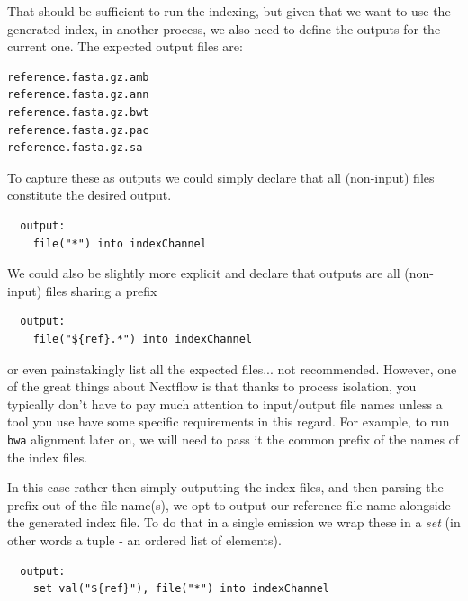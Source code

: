 That should be sufficient to run the indexing, but given that we want to use the generated index,
in another process, we also need to define the outputs for the current one. 
The expected output files are:

\begin{lstlisting}
reference.fasta.gz.amb
reference.fasta.gz.ann
reference.fasta.gz.bwt
reference.fasta.gz.pac
reference.fasta.gz.sa
\end{lstlisting}

To capture these as outputs we could simply declare that all (non-input)
files constitute the desired output.

\begin{lstlisting}
  output:
    file("*") into indexChannel 
\end{lstlisting}

We could also be slightly more explicit and declare that outputs are all (non-input)
files sharing a prefix

\begin{lstlisting}
  output:
    file("${ref}.*") into indexChannel 
\end{lstlisting}

or even painstakingly list all the expected files... not recommended.
%
%
%
However, one of the great things about Nextflow is that thanks to process isolation, 
you typically don't have to pay much attention to input/output file names 
unless a tool you use have some specific requirements in this regard.
For example, to run \texttt{bwa} alignment later on, we will need to pass it 
the common prefix of the names of the index files. 

In this case rather then simply outputting the index files,
and then parsing the prefix out of the file name(s), 
we opt to output our reference file name alongside the generated index file.
To do that in a single emission we wrap these in a \emph{set} 
(in other words a tuple - an ordered list of elements).

\begin{lstlisting}
  output:
    set val("${ref}"), file("*") into indexChannel 
\end{lstlisting}


